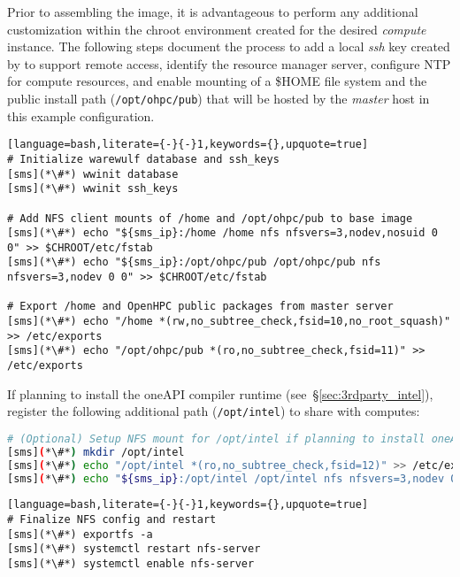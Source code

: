 Prior to assembling the image, it is advantageous to perform any additional
customization within the chroot environment created for the desired {\em
 compute} instance. The following steps document the process to add a local
{\em ssh} key created by \Warewulf{} to support remote access, identify the
resource manager server, configure NTP for compute resources, and enable \NFS{}
mounting of a \$HOME file system and the public \OHPC{} install path
(\texttt{/opt/ohpc/pub}) that will be hosted by the {\em master} host in this
example configuration.

\vspace*{0.15cm}
\begin{lstlisting}[language=bash,literate={-}{-}1,keywords={},upquote=true]
# Initialize warewulf database and ssh_keys
[sms](*\#*) wwinit database
[sms](*\#*) wwinit ssh_keys

# Add NFS client mounts of /home and /opt/ohpc/pub to base image
[sms](*\#*) echo "${sms_ip}:/home /home nfs nfsvers=3,nodev,nosuid 0 0" >> $CHROOT/etc/fstab
[sms](*\#*) echo "${sms_ip}:/opt/ohpc/pub /opt/ohpc/pub nfs nfsvers=3,nodev 0 0" >> $CHROOT/etc/fstab

# Export /home and OpenHPC public packages from master server
[sms](*\#*) echo "/home *(rw,no_subtree_check,fsid=10,no_root_squash)" >> /etc/exports
[sms](*\#*) echo "/opt/ohpc/pub *(ro,no_subtree_check,fsid=11)" >> /etc/exports
\end{lstlisting}

\noindent If planning to install the \IntelR{} oneAPI compiler runtime
(see~\S\ref{sec:3rdparty_intel}), register the
following additional path (\texttt{/opt/intel}) to share with computes:

\begin{lstlisting}[language=bash,keywords={},upquote=true,keepspaces]
# (Optional) Setup NFS mount for /opt/intel if planning to install oneAPI packages
[sms](*\#*) mkdir /opt/intel
[sms](*\#*) echo "/opt/intel *(ro,no_subtree_check,fsid=12)" >> /etc/exports
[sms](*\#*) echo "${sms_ip}:/opt/intel /opt/intel nfs nfsvers=3,nodev 0 0" >> $CHROOT/etc/fstab
\end{lstlisting}

\begin{lstlisting}[language=bash,literate={-}{-}1,keywords={},upquote=true]
# Finalize NFS config and restart
[sms](*\#*) exportfs -a
[sms](*\#*) systemctl restart nfs-server
[sms](*\#*) systemctl enable nfs-server
\end{lstlisting}
